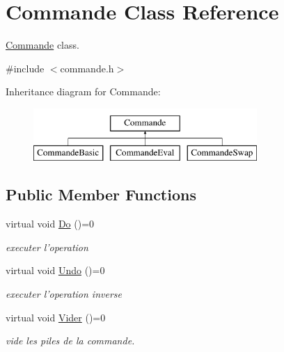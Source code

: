 \hypertarget{class_commande}{\section{Commande Class Reference}
\label{class_commande}
}


\hyperlink{class_commande}{Commande} class.  




{\ttfamily \#include $<$commande.\-h$>$}

Inheritance diagram for Commande\-:\begin{figure}[H]
\begin{center}
\leavevmode
\includegraphics[height=2.000000cm]{class_commande}
\end{center}
\end{figure}
\subsection*{Public Member Functions}
\begin{DoxyCompactItemize}
\item 
\hypertarget{class_commande_a9fc0c740359ac4f0d34b9f109e3c0155}{virtual void \hyperlink{class_commande_a9fc0c740359ac4f0d34b9f109e3c0155}{Do} ()=0}\label{class_commande_a9fc0c740359ac4f0d34b9f109e3c0155}

\begin{DoxyCompactList}\small\item\em executer l'operation \end{DoxyCompactList}\item 
\hypertarget{class_commande_a8523106c6ca6cc7c04323a641c16e563}{virtual void \hyperlink{class_commande_a8523106c6ca6cc7c04323a641c16e563}{Undo} ()=0}\label{class_commande_a8523106c6ca6cc7c04323a641c16e563}

\begin{DoxyCompactList}\small\item\em executer l'operation inverse \end{DoxyCompactList}\item 
\hypertarget{class_commande_ad2c20aed07bfd27f220daf3dc316bbb5}{virtual void \hyperlink{class_commande_ad2c20aed07bfd27f220daf3dc316bbb5}{Vider} ()=0}\label{class_commande_ad2c20aed07bfd27f220daf3dc316bbb5}

\begin{DoxyCompactList}\small\item\em vide les piles de la commande. \end{DoxyCompactList}\end{DoxyCompactItemize}


